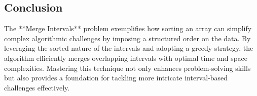 \subsection*{Conclusion}
The **Merge Intervals** problem exemplifies how sorting an array can simplify complex algorithmic challenges by imposing a structured order on the data. By leveraging the sorted nature of the intervals and adopting a greedy strategy, the algorithm efficiently merges overlapping intervals with optimal time and space complexities. Mastering this technique not only enhances problem-solving skills but also provides a foundation for tackling more intricate interval-based challenges effectively.